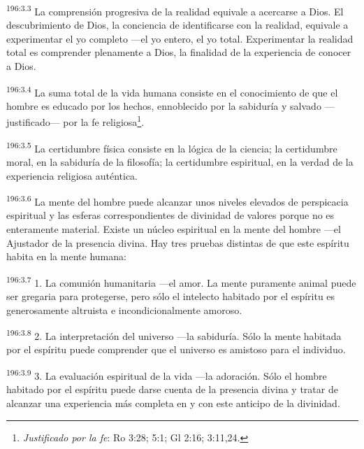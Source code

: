 \par
\textsuperscript{196:3.3} La comprensión progresiva de la realidad equivale a acercarse a Dios. El descubrimiento de Dios, la conciencia de identificarse con la realidad, equivale a experimentar el yo completo ---el yo entero, el yo total. Experimentar la realidad total es comprender plenamente a Dios, la finalidad de la experiencia de conocer a Dios.

\par
\textsuperscript{196:3.4} La suma total de la vida humana consiste en el conocimiento de que el hombre es educado por los hechos, ennoblecido por la sabiduría y salvado ---justificado--- por la fe religiosa\footnote{\textit{Justificado por la fe}: Ro 3:28; 5:1; Gl 2:16; 3:11,24.}.

\par
\textsuperscript{196:3.5} La certidumbre física consiste en la lógica de la ciencia; la certidumbre moral, en la sabiduría de la filosofía; la certidumbre espiritual, en la verdad de la experiencia religiosa auténtica.

\par
\textsuperscript{196:3.6} La mente del hombre puede alcanzar unos niveles elevados de perspicacia espiritual y las esferas correspondientes de divinidad de valores porque no es enteramente material. Existe un núcleo espiritual en la mente del hombre ---el Ajustador de la presencia divina. Hay tres pruebas distintas de que este espíritu habita en la mente humana:

\par
\textsuperscript{196:3.7} 1. La comunión humanitaria ---el amor. La mente puramente animal puede ser gregaria para protegerse, pero sólo el intelecto habitado por el espíritu es generosamente altruista e incondicionalmente amoroso.

\par
\textsuperscript{196:3.8} 2. La interpretación del universo ---la sabiduría. Sólo la mente habitada por el espíritu puede comprender que el universo es amistoso para el individuo.

\par
\textsuperscript{196:3.9} 3. La evaluación espiritual de la vida ---la adoración. Sólo el hombre habitado por el espíritu puede darse cuenta de la presencia divina y tratar de alcanzar una experiencia más completa en y con este anticipo de la divinidad.

